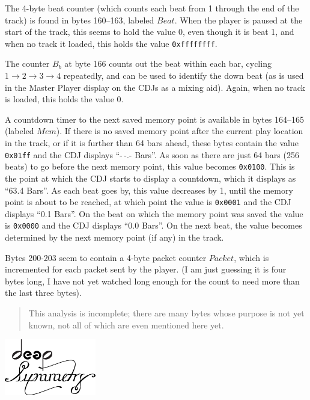 \documentclass[11pt]{article}
\begin{document}
The 4-byte beat counter (which counts each beat from 1 through the end
of the track) is found in bytes 160--163, labeled $Beat$. When the
player is paused at the start of the track, this seems to hold the
value 0, even though it is beat 1, and when no track it loaded, this
holds the value {\tt 0xffffffff}.

The counter $B_b$ at byte 166 counts out the beat within each bar,
cycling $1\to2\to3\to4$ repeatedly, and can be used to identify the
down beat (as is used in the Master Player display on the CDJs as a
mixing aid). Again, when no track is loaded, this holds the value 0.

A countdown timer to the next saved memory point is available in bytes
164--165 (labeled $Mem$). If there is no saved memory point after the
current play location in the track, or if it is further than 64 bars
ahead, these bytes contain the value {\tt 0x01ff} and the CDJ displays
``-\,-.- Bars''. As soon as there are just 64 bars (256 beats) to
go before the next memory point, this value becomes {\tt 0x0100}. This
is the point at which the CDJ starts to display a countdown, which it
displays as ``63.4 Bars''. As each beat goes by, this value decreases
by 1, until the memory point is about to be reached, at which point
the value is {\tt 0x0001} and the CDJ displays ``0.1 Bars''. On the
beat on which the memory point was saved the value is {\tt 0x0000} and
the CDJ displays ``0.0 Bars''. On the next beat, the value becomes
determined by the next memory point (if any) in the track.

Bytes 200-203 seem to contain a 4-byte packet counter $Packet$, which
is incremented for each packet sent by the player. (I am just guessing
it is four bytes long, I have not yet watched long enough for the
count to need more than the last three bytes).

\begin{quote}
  This analysis is incomplete; there are many bytes whose purpose is
  not yet known, not all of which are even mentioned here yet.
\end{quote}

\begin{center}
  \includegraphics[width=4cm]{DS-Logo-bw-4k}
\end{center}
\end{document}
